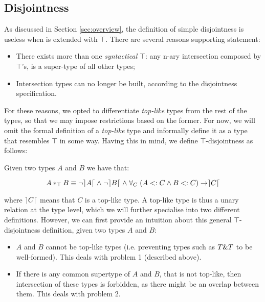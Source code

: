 
\subsection{Disjointness} 
As discussed in Section \ref{sec:overview}, the definition of
simple disjointness is useless when \name is extended with $\top$.
There are several reasons supporting statement: 

\begin{itemize}
\item There exists more than one \emph{syntactical} $\top$: any n-ary intersection composed by $\top$'s, 
is a super-type of all other types;
\item Intersection types can no longer be built, according to the disjointness specification.
\end{itemize}

For these reasons, we opted to differentiate \emph{top-like} types from the rest of the types,
so that we may impose restrictions based on the former.
For now, we will omit the formal definition of a \emph{top-like} type and informally
define it as a type that resembles $\top$ in some way. 
Having this in mind, we define $\top$-disjointness as follows:
\begin{definition}
Given two types $A$ and $B$ we have that:

\[A *_{\top} B \equiv \neg \rceil A \lceil \; \wedge \; \neg \rceil B \lceil \; \wedge \; 
\forall_C \; ( A <: C \wedge B <: C ) \rightarrow \rceil C \lceil \]

\end{definition}
\noindent where $\rceil C \lceil$ means that $C$ is a top-like type.
A top-like type is thus a unary relation at the type level, which we will further specialise into two different definitions. 
However, we can first provide an intuition about this general $\top$-disjointness definition, given two
types $A$ and $B$:
\begin{itemize}
\item $A$ and $B$ cannot be top-like types (i.e. preventing types such as $T \& T$ to be well-formed).
This deals with problem 1 (described above).
\item If there is any common supertype of $A$ and $B$, that is not top-like, then 
intersection of these types is forbidden, as there might be an overlap between them.
This deals with problem 2.
\end{itemize}

